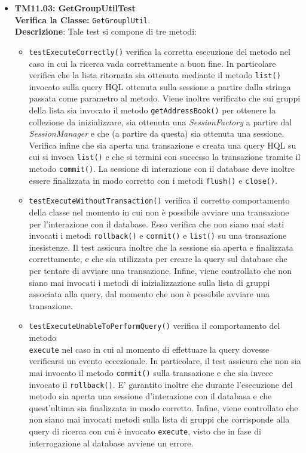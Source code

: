 \begin{itemize}
\item \textbf{TM11.03: GetGroupUtilTest}\\
\textbf{Verifica la Classe:} \texttt{GetGrouplUtil}.\\
\textbf{Descrizione}: %
Tale test si compone di tre metodi:
\begin{itemize}
\item \texttt{testExecuteCorrectly()} verifica la corretta esecuzione del metodo nel caso in cui la ricerca vada correttamente a buon fine. In particolare verifica che la lista ritornata sia ottenuta mediante il metodo \texttt{list()} invocato sulla query HQL ottenuta sulla sessione a partire dalla stringa passata come parametro al metodo.
Viene inoltre verificato che sui gruppi della lista sia invocato il metodo \texttt{getAddressBook()} per ottenere la collezione da inizializzare, sia ottenuta una \textit{SessionFactory} a partire dal \textit{SessionManager} e che (a partire da questa) sia ottenuta una sessione.
Verifica infine che sia aperta una transazione e creata una query HQL su cui si invoca \texttt{list()} e che si termini con successo la transazione tramite il metodo \texttt{commit()}.
La sessione di interazione con il database deve inoltre essere finalizzata in modo corretto con i metodi \texttt{flush()} e \texttt{close()}.

\item \texttt{testExecuteWithoutTransaction()} verifica il corretto comportamento della classe nel momento in cui non è possibile avviare una transazione per l'interazione con il database. Esso verifica che non siano mai stati invocati i metodi \texttt{rollback()} e \texttt{commit()} e \texttt{list()} su una transazione inesistenze.
Il test assicura inoltre che la sessione sia aperta e finalizzata correttamente, e che sia utilizzata per creare la query sul database che per tentare di avviare una transazione.
Infine, viene controllato che non siano mai invocati i metodi di inizializzazione sulla lista di gruppi associata alla query, dal momento che non è possibile avviare una transazione.

\item \texttt{testExecuteUnableToPerformQuery()} verifica il comportamento del metodo \\ \texttt{execute} nel caso in cui al momento di effettuare la query dovesse verificarsi un evento eccezionale. In particolare, il test assicura che non sia mai invocato il metodo \texttt{commit()} sulla transazione e che sia invece invocato il \texttt{rollback()}.
E' garantito inoltre che durante l'esecuzione del metodo sia aperta una sessione d'interazione con il databasa e che quest'ultima sia finalizzata in modo corretto. Infine, viene controllato che non siano mai invocati metodi sulla lista di gruppi che corrisponde alla query di ricerca con cui è invocato \texttt{execute}, visto che in fase di interrogazione al database avviene un errore.


\end{itemize}
\end{itemize}
